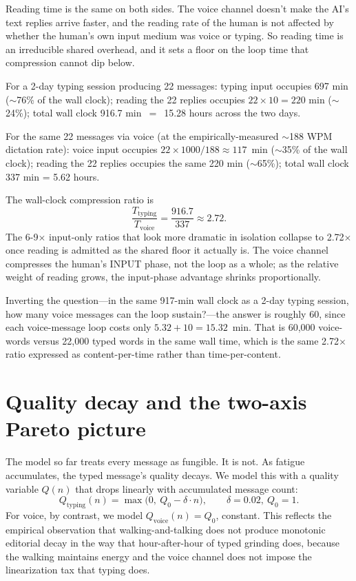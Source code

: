 \documentclass[11pt]{article}
\begin{document}
Reading time is the same on both sides. The voice channel doesn't make the AI's text replies arrive faster, and the reading rate of the human is not affected by whether the human's own input medium was voice or typing. So reading time is an irreducible shared overhead, and it sets a floor on the loop time that compression cannot dip below.

For a 2-day typing session producing 22 messages: typing input occupies 697 min ($\sim$76\% of the wall clock); reading the 22 replies occupies $22 \times 10 = 220$ min ($\sim$24\%); total wall clock 916.7 min~$=$~15.28 hours across the two days.

For the same 22 messages via voice (at the empirically-measured $\sim$188 WPM dictation rate): voice input occupies $22 \times 1000/188 \approx 117$~min ($\sim$35\% of the wall clock); reading the 22 replies occupies the same 220 min ($\sim$65\%); total wall clock 337 min = 5.62 hours.

The wall-clock compression ratio is
\[
\frac{T_{\text{typing}}}{T_{\text{voice}}} = \frac{916.7}{337} \approx 2.72.
\]
The 6-9$\times$ input-only ratios that look more dramatic in isolation collapse to 2.72$\times$ once reading is admitted as the shared floor it actually is. The voice channel compresses the human's INPUT phase, not the loop as a whole; as the relative weight of reading grows, the input-phase advantage shrinks proportionally.

Inverting the question---in the same 917-min wall clock as a 2-day typing session, how many voice messages can the loop sustain?---the answer is roughly 60, since each voice-message loop costs only $5.32 + 10 = 15.32$~min. That is 60{,}000 voice-words versus 22{,}000 typed words in the same wall time, which is the same 2.72$\times$ ratio expressed as content-per-time rather than time-per-content.

\section{Quality decay and the two-axis Pareto picture}

The model so far treats every message as fungible. It is not. As fatigue accumulates, the typed message's quality decays. We model this with a quality variable $Q(n)$ that drops linearly with accumulated message count:
\[
Q_{\text{typing}}(n) = \max\bigl(0,~Q_0 - \delta \cdot n\bigr), \qquad \delta = 0.02,~ Q_0 = 1.
\]
For voice, by contrast, we model $Q_{\text{voice}}(n) = Q_0$, constant. This reflects the empirical observation that walking-and-talking does not produce monotonic editorial decay in the way that hour-after-hour of typed grinding does, because the walking maintains energy and the voice channel does not impose the linearization tax that typing does.
\end{document}
